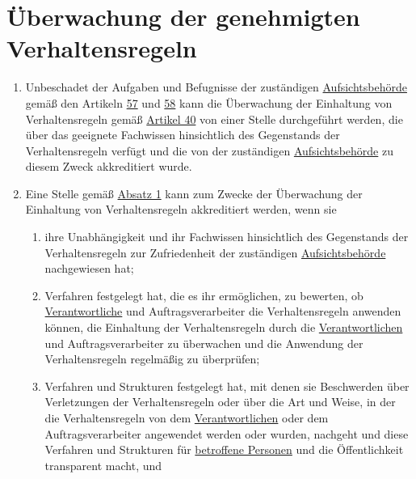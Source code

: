 \chapter{Überwachung der genehmigten Verhaltensregeln}
\label{ch:41}


\begin{enumerate}

  \item Unbeschadet der Aufgaben und Befugnisse der zuständigen \hyperref[itm:04-21]{Aufsichtsbehörde} gemäß den Artikeln \hyperref[ch:57]
   {57} und \hyperref[ch:58]{58} kann die Überwachung der Einhaltung von Verhaltensregeln gemäß \hyperref[ch:40]
   {Artikel 40} von einer Stelle durchgeführt werden, die über das geeignete Fachwissen hinsichtlich des Gegenstands
   der Verhaltensregeln verfügt und die von der zuständigen \hyperref[itm:04-21]{Aufsichtsbehörde} zu diesem Zweck akkreditiert wurde.
  \label{itm:41-1}

  \item Eine Stelle gemäß \hyperref[itm:41-1]{Absatz 1} kann zum Zwecke der Überwachung der Einhaltung von
   Verhaltensregeln akkreditiert werden, wenn sie
  \label{itm:41-2}

  \begin{enumerate}
  
    \item ihre Unabhängigkeit und ihr Fachwissen hinsichtlich des Gegenstands der Verhaltensregeln zur Zufriedenheit der
     zuständigen \hyperref[itm:04-21]{Aufsichtsbehörde} nachgewiesen hat;
    \label{itm:41-2a}

    \item Verfahren festgelegt hat, die es ihr ermöglichen, zu bewerten, ob \hyperref[itm:04-7]{Verantwortliche} und Auftragsverarbeiter die
     Verhaltensregeln anwenden können, die Einhaltung der Verhaltensregeln durch die \hyperref[itm:04-7]{Verantwortlichen} und
     Auftragsverarbeiter zu überwachen und die Anwendung der Verhaltensregeln regelmäßig zu überprüfen;
    \label{itm:41-2b}

    \item Verfahren und Strukturen festgelegt hat, mit denen sie Beschwerden über Verletzungen der Verhaltensregeln oder
     über die Art und Weise, in der die Verhaltensregeln von dem \hyperref[itm:04-7]{Verantwortlichen} oder dem Auftragsverarbeiter
     angewendet werden oder wurden, nachgeht und diese Verfahren und Strukturen für \hyperref[itm:04-1]{betroffene Personen} und die
     Öffentlichkeit transparent macht, und
    \label{itm:41-2c}


\end{enumerate}
\end{enumerate}

